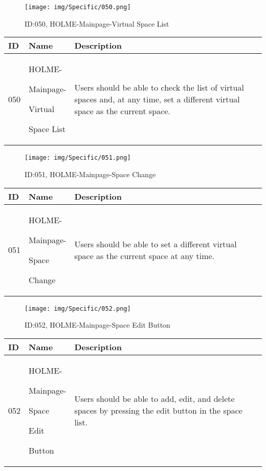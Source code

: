 \documentclass[conference]{IEEEtran}
\begin{document}
\begin{enumerate}
\begin{figure}[h]
\centering
\texttt{[image: img/Specific/050.png]}
\caption{ID:050, HOLME-Mainpage-Virtual Space List}
\end{figure}
\begin{table}[h]
\def\arraystretch{1.2} \small
    \begin{tabular}{|p{1cm}|p{1.8cm}|p{5.0cm}|}
        \hline
        ID & Name & Description\\ \hline
         050 \par  & HOLME-\par Mainpage-\par Virtual \par Space List&Users should be able to check the list of virtual spaces and, at any time, set a different virtual space as the current space.\\ \hline
    \end{tabular}
\end{table}

\begin{figure}[h]
\centering
\texttt{[image: img/Specific/051.png]}
\caption{ID:051, HOLME-Mainpage-Space Change}
\end{figure}
\begin{table}[h]
\def\arraystretch{1.2} \small
    \begin{tabular}{|p{1cm}|p{1.8cm}|p{5.0cm}|}
        \hline
        ID & Name & Description\\ \hline
         051 \par  & HOLME-\par Mainpage-\par Space \par Change&Users should be able to set a different virtual space as the current space at any time.\\ \hline
    \end{tabular}
\end{table}

\begin{figure}[h]
\centering
\texttt{[image: img/Specific/052.png]}
\caption{ID:052, HOLME-Mainpage-Space Edit Button}
\end{figure}
\begin{table}[h]
\def\arraystretch{1.2} \small
    \begin{tabular}{|p{1cm}|p{1.8cm}|p{5.0cm}|}
        \hline
        ID & Name & Description\\ \hline
         052 \par  & HOLME-\par Mainpage-\par Space \par Edit \par Button &Users should be able to add, edit, and delete spaces by pressing the edit button in the space list.\\ \hline
    \end{tabular}
\end{table}


\end{enumerate}
\end{document}
